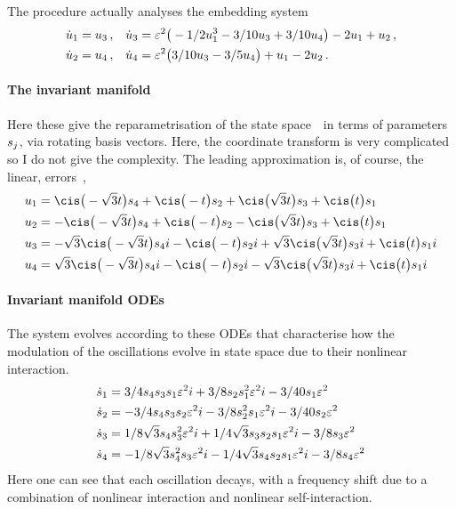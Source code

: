 The procedure actually analyses the embedding system
\begin{align*}&
\dot u_{1}=u\sb3\,,
&&
\dot u_{3}=\varepsilon^{2} \big(-1/2 u\sb1^{3}-3/10 u\sb3+3/10 u\sb4\big)-2 
u\sb1+u\sb2\,,
\\&
\dot u_{2}=u\sb4\,,
&&
\dot u_{4}=\varepsilon^{2} \big(3/10 u\sb3-3/5 u\sb4\big)+u\sb1-2 u\sb2\,.
\end{align*}



\paragraph{The invariant manifold} 
Here these give the reparametrisation of the state space~\uv\ in
terms of parameters~\(s\sb j\), via rotating basis vectors.
Here, the coordinate transform is very complicated so I do not give the complexity.  The leading approximation is, of course, the linear, errors~,
\begin{align*}&
u_{1}=\cis\big(-\sqrt {3} t\big) s_{4}+\cis\big(-t\big) s_{2}+\cis\big(
\sqrt {3} t\big) s_{3}+\cis\big(t\big) s_{1}
\\&
u_{2}=-\cis\big(-\sqrt {3} t\big) s_{4}+\cis\big(-t\big) s_{2}-\cis\big(
\sqrt {3} t\big) s_{3}+\cis\big(t\big) s_{1}
\\&
u_{3}=-\sqrt {3} \cis\big(-\sqrt {3} t\big) s_{4} i-\cis\big(-t\big) s_{
2} i+\sqrt {3} \cis\big(\sqrt {3} t\big) s_{3} i+\cis\big(t\big) s_{1} i
\\&
u_{4}=\sqrt {3} \cis\big(-\sqrt {3} t\big) s_{4} i-\cis\big(-t\big) s_{2
} i-\sqrt {3} \cis\big(\sqrt {3} t\big) s_{3} i+\cis\big(t\big) s_{1} i
\end{align*}

 
\paragraph{Invariant manifold ODEs} 
The system evolves according to these ODEs that characterise how the modulation of the oscillations evolve in state space due to their nonlinear interaction.
\begin{align*}&
\dot s_{1}=3/4 s_{4} s_{3} s_{1} \varepsilon^{2} i+3/8 s_{2} s_{1}^{2} \varepsilon^{2}
 i-3/40 s_{1} \varepsilon^{2}
\\&
\dot s_{2}=-3/4 s_{4} s_{3} s_{2} \varepsilon^{2} i-3/8 s_{2}^{2} s_{1} \varepsilon^{2
} i-3/40 s_{2} \varepsilon^{2}
\\&
\dot s_{3}=1/8 \sqrt {3} s_{4} s_{3}^{2} \varepsilon^{2} i+1/4 \sqrt {3} s_{3} 
s_{2} s_{1} \varepsilon^{2} i-3/8 s_{3} \varepsilon^{2}
\\&
\dot s_{4}=-1/8 \sqrt {3} s_{4}^{2} s_{3} \varepsilon^{2} i-1/4 \sqrt {3} s_{4}
 s_{2} s_{1} \varepsilon^{2} i-3/8 s_{4} \varepsilon^{2}
\end{align*}
Here one can see that each oscillation decays, with a frequency shift due to a combination of nonlinear interaction and nonlinear self-interaction.

